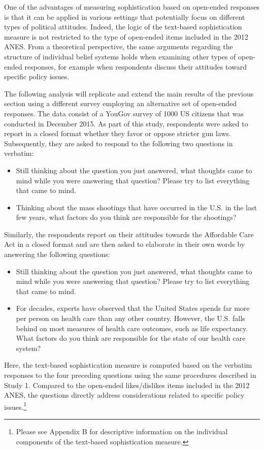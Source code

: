 \documentclass[12pt]{article}
\begin{document}
One of the advantages of measuring sophistication based on open-ended responses is that it can be applied in various settings that potentially focus on different types of political attitudes. Indeed, the logic of the text-based sophistication measure is not restricted to the type of open-ended items included in the 2012 ANES. From a theoretical perspective, the same arguments regarding the structure of individual belief systems holds when examining other types of open-ended responses, for example when respondents discuss their attitudes toward specific policy issues.

The following analysis will replicate and extend the main results of the previous section using a different survey employing an alternative set of open-ended responses. The data consist of a YouGov survey of 1000 US citizens that was conducted in December 2015. As part of this study, respondents were asked to report in a closed format whether they favor or oppose stricter gun laws. Subsequently, they are asked to respond to the following two questions in verbatim:
\begin{itemize}
\item Still thinking about the question you just answered, what thoughts came to mind while you were answering that question? Please try to list everything that came to mind.
\item Thinking about the mass shootings that have occurred in the U.S. in the last few years, what factors do you think are responsible for the shootings?
\end{itemize}
Similarly, the respondents report on their attitudes towards the Affordable Care Act in a closed format and are then asked to elaborate in their own words by answering the following questions:
\begin{itemize}
\item Still thinking about the question you just answered, what thoughts came to mind while you were answering that question? Please try to list everything that came to mind.
\item For decades, experts have observed that the United States spends far more per person on health care than any other country. However, the U.S. falls behind on most measures of health care outcomes, such as life expectancy. What factors do you think are responsible for the state of our health care system?
\end{itemize}
Here, the text-based sophistication measure is computed based on the verbatim responses to the four preceding questions using the same procedures described in Study 1. Compared to the open-ended likes/dislikes items included in the 2012 ANES, the questions directly address considerations related to specific policy issues.\footnote{Please see Appendix B for descriptive information on the individual components of the text-based sophistication measure.}
\end{document}
